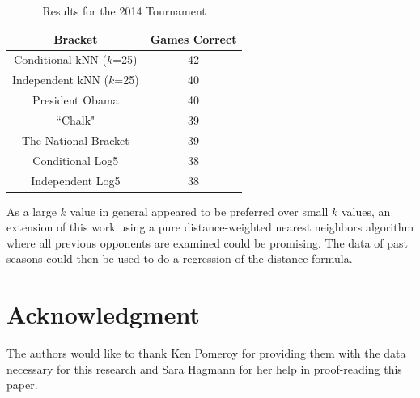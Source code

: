 \documentclass[5p, preprint]{elsarticle}
\begin{document}
 \begin{table}[!t]
  \caption{Results for the 2014 Tournament}
  \label{tab_2014}
  \centering
  \begin{tabular}{|c|c|}
   \hline
   Bracket & Games Correct\\
   \hline
   \hline
   Conditional kNN ($k$=25) & 42\\
   Independent kNN ($k$=25) & 40\\
   President Obama          & 40\\
   ``Chalk"                 & 39\\
   The National Bracket     & 39\\
   Conditional Log5         & 38\\
   Independent Log5         & 38\\
   \hline
  \end{tabular}
 \end{table}

As a large $k$ value in general appeared to be preferred over small $k$ values, an extension of this work using a pure distance-weighted nearest neighbors algorithm where all previous opponents are examined could be promising. The data of past seasons could then be used to do a regression of the distance formula. 

\vspace*{-.2in}

\section*{Acknowledgment}

The authors would like to thank Ken Pomeroy for providing them with the data necessary for this research and Sara Hagmann for her help in proof-reading this paper.

\vspace*{-.2in}



\end{document}
